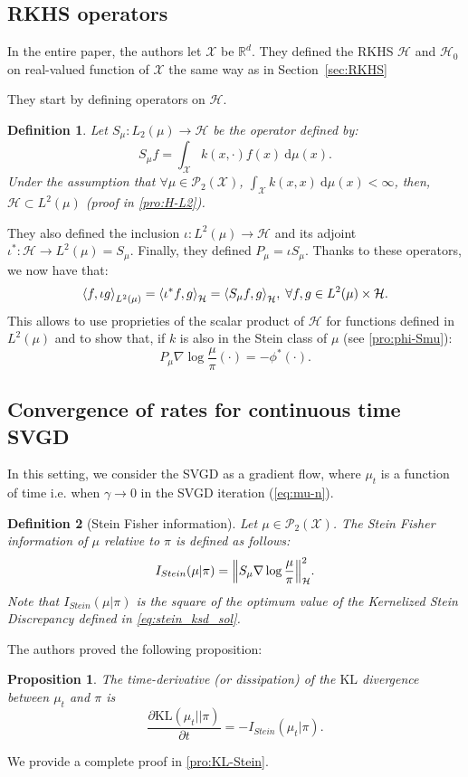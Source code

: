 \documentclass{article}
\newcommand{\R}{\mathbb{R}}
\newcommand{\X}{\mathcal{X}}
\renewcommand{\P}{\mathcal{P}}
\newcommand{\KL}{\mathrm{KL}}
\renewcommand{\H}{\mathcal{H}}
\newcommand{\diff}[2]{\frac{\partial #1}{\partial #2}}
\renewcommand{\d}{\: \mathrm{d}}
\newcommand{\Stein}{I_{Stein}(\mu | \pi)}
\DeclarePairedDelimiter{\norm}{\|}{\|}
\DeclarePairedDelimiter{\sca}{\langle}{\rangle}
\newtheorem{definition}{Definition}
\newtheorem{proposition}{Proposition}
\begin{document}
\subsection{RKHS operators}
In the entire paper, the authors let $\X$ be $\R^d$. They defined
the RKHS $\H$ and $\H_0$ on real-valued function of $\X$ the same way as in
Section~\ref{sec:RKHS}

\noindent
They start by defining operators on $\H$.
\begin{definition}
  Let $S_\mu : L_2(\mu) \to \H$ be the operator defined by:
  $$
  S_\mu f = \int_\X k(x, \cdot) f(x) \d \mu(x).
  $$
  Under the assumption that $\forall \mu \in \P_2(\X)$, $\int_\X k(x, x) \d \mu(x) < \infty$,
  then, $\H \subset L^2(\mu)$
  (proof in \ref{pro:H-L2}).
\label{def:S-mu}
\end{definition}
They also defined the inclusion $\iota : L^2(\mu) \to \H$ and
its adjoint $\iota^* : \H \to L^2(\mu) = S_\mu$. Finally, they defined
$P_\mu = \iota S_\mu$. Thanks to these operators, we now have that:
$$
\sca*{f, \iota g}_{L^2(\mu)} = \sca*{\iota^* f, g}_\H = \sca*{S_\mu f, g}_\H,
\; \forall f, g \in L^2(\mu) \times \H.
$$
This allows to use proprieties of the scalar product of $\H$ for functions
defined in $L^2(\mu)$ and to show that, if $k$ is also in the Stein class
of $\mu$ (see \ref{pro:phi-Smu}):
\begin{equation}
    P_\mu \nabla \log \frac{\mu}{\pi}(\cdot) = -\phi^*(\cdot).
    \label{eq:phi-Smu}
\end{equation}


\subsection{Convergence of rates for continuous time SVGD}
In this setting, we consider the SVGD as a gradient flow, where $\mu_t$ is a function
of time i.e. when $\gamma \to 0$ in the SVGD iteration (\ref{eq:mu-n}).

\begin{definition}[Stein Fisher information]
  Let $\mu \in \P_2(\X)$. The Stein Fisher information of $\mu$ relative to
  $\pi$ is defined as follows:
  $$
  \Stein = \norm*{S_\mu \nabla \log \frac{\mu}{\pi}}_\H^2.
  $$
  Note that $\Stein$ is the square of the optimum value of the
  Kernelized Stein Discrepancy defined in \eqref{eq:stein_ksd_sol}.
\end{definition}

The authors proved the following proposition:
\begin{proposition}\label{prop:KL-Stein}
  The time-derivative (or dissipation) of the $\KL$ divergence between $\mu_t$ and $\pi$ is
  \begin{equation}
    \diff{\KL(\mu_t || \pi)}{t} = - I_{Stein}(\mu_t | \pi).
    \label{eq:KL-time-diff}
  \end{equation}
\end{proposition}
\noindent
We provide a complete proof in \ref{pro:KL-Stein}.\\
\end{document}
